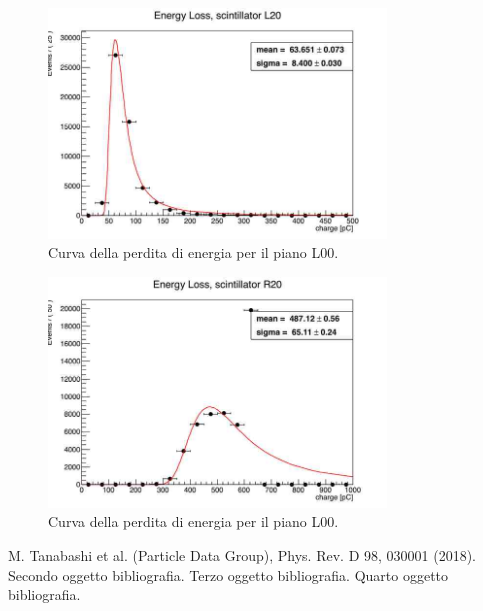 \begin{figure}[H]
  \centering
  \includegraphics[width=0.8\textwidth]{plots/energy_L20.jpg}
  \caption{Curva della perdita di energia per il piano L00.}
  \label{fig:l20}
\end{figure}

\begin{figure}[H]
  \centering
  \includegraphics[width=0.8\textwidth]{plots/energy_R20.jpg}
  \caption{Curva della perdita di energia per il piano L00.}
  \label{fig:r20}
\end{figure}


\begin{thebibliography}{90}             %
\rhead[\fancyplain{}{\bfseries \leftmark}]{\fancyplain{}{\bfseries
\thepage}}
 M. Tanabashi et al. (Particle Data Group), Phys. Rev. D 98, 030001 (2018).
 Secondo oggetto bibliografia.
 Terzo oggetto bibliografia.
 Quarto oggetto bibliografia.
\end{thebibliography}

